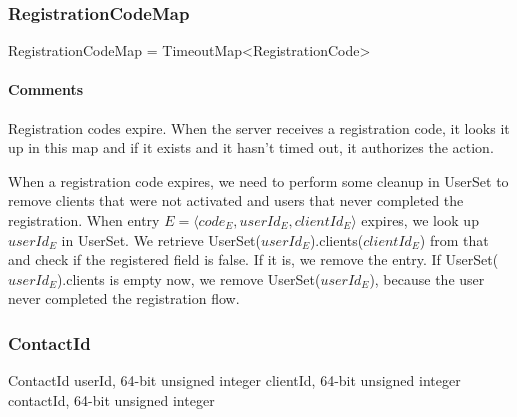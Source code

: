 \documentclass[a4paper,10pt,draft]{article}
\begin{document}
\subsubsection{RegistrationCodeMap}
\label{sec:structure:RegistrationCodeMap}

\begin{verbbox}
RegistrationCodeMap = TimeoutMap<RegistrationCode>
\end{verbbox}
\begin{center}
\theverbbox
\end{center}

\begin{inparaitem}[ ]
 \item \unique
 \item \persistent
 \item \secure
\end{inparaitem}

\paragraph*{Comments}
Registration codes expire. When the server receives a registration code, it looks it up in this map and if it exists and it hasn't timed out, it authorizes the action.

When a registration code expires, we need to perform some cleanup in UserSet to remove clients that were not activated and users that never completed the registration. When entry 
$E=\langle code_E,userId_E,clientId_E\rangle$ expires, we look up $userId_E$ in UserSet. We retrieve UserSet($userId_E$).clients($clientId_E$) from that and check if the 
registered field is false. If it is, we remove the entry. If UserSet($userId_E$).clients is empty now, we remove UserSet($userId_E$), because the user never completed the 
registration flow.

\subsubsection{ContactId}

\begin{verbbox}
ContactId
{
  userId, 64-bit unsigned integer
  clientId, 64-bit unsigned integer
  contactId, 64-bit unsigned integer
}
\end{verbbox}
\begin{center}
\theverbbox
\end{center}

\begin{inparaitem}[ ]
 \item \infrastructure
\end{inparaitem}
\end{document}
